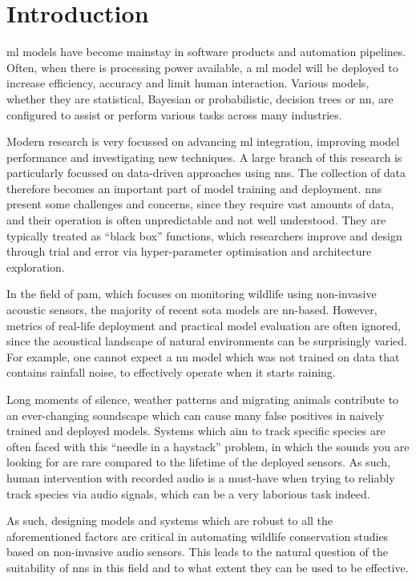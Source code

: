 \chapter{Introduction}

\Ac{ml} models have become mainstay in software products and automation pipelines. Often, when there is processing power available, a \ac{ml} model will be deployed to increase efficiency, accuracy and limit human interaction. Various models, whether they are statistical, Bayesian or probabilistic, decision trees or \ac{nn}, are configured to assist or perform various tasks across many industries.

Modern research is very focussed on advancing \ac{ml} integration, improving model performance and investigating new techniques. A large branch of this research is particularly focussed on data-driven approaches using \acp{nn}. The collection of data therefore becomes an important part of model training and deployment. \Acp{nn} present some challenges and concerns, since they require vast amounts of data, and their operation is often unpredictable and not well understood. They are typically treated as ``black box'' functions, which researchers improve and design through trial and error via hyper-parameter optimisation and architecture exploration.

In the field of \ac{pam}, which focuses on monitoring wildlife using non-invasive acoustic sensors, the majority of recent \ac{sota} models are \ac{nn}-based. However, metrics of real-life deployment and practical model evaluation are often ignored, since the acoustical landscape of natural environments can be surprisingly varied. For example, one cannot expect a \ac{nn} model which was not trained on data that contains rainfall noise, to effectively operate when it starts raining. 

Long moments of silence, weather patterns and migrating animals contribute to an ever-changing soundscape which can cause many false positives in naively trained and deployed models. Systems which aim to track specific species are often faced with this ``needle in a haystack'' problem, in which the sounds you are looking for are rare compared to the lifetime of the deployed sensors. As such, human intervention with recorded audio is a must-have when trying to reliably track species via audio signals, which can be a very laborious task indeed.

As such, designing models and systems which are robust to all the aforementioned factors are critical in automating wildlife conservation studies based on non-invasive audio sensors. This leads to the natural question of the suitability of \acp{nn} in this field and to what extent they can be used to be effective.

